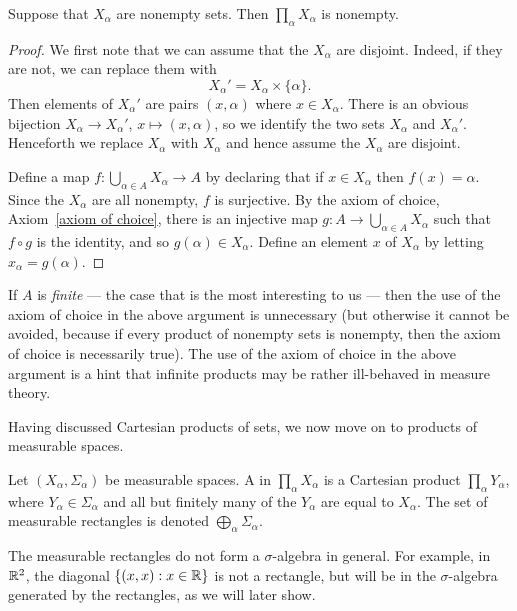 \begin{lemma}
Suppose that $X_{\alpha}$ are nonempty sets. Then $\prod_{\alpha} X_{\alpha}$ is nonempty.
\end{lemma}
\begin{proof}
We first note that we can assume that the $X_{\alpha}$ are disjoint. Indeed, if they are not, we can replace them with
\[X_{\alpha}' = X_{\alpha} \times \{\alpha\}.\]
Then elements of $X_{\alpha}'$ are pairs $(x, \alpha)$ where $x \in X_{\alpha}$.
There is an obvious bijection $X_{\alpha} \to X_{\alpha}'$, $x \mapsto (x, \alpha)$, so we identify the two sets $X_{\alpha}$ and $X_{\alpha}'$.
Henceforth we replace $X_{\alpha}$ with $X_{\alpha}$ and hence assume the $X_{\alpha}$ are disjoint.

Define a map $f: \bigcup_{\alpha \in A} X_{\alpha} \to A$ by declaring that if $x \in X_{\alpha}$ then $f(x) = \alpha$.
Since the $X_{\alpha}$ are all nonempty, $f$ is surjective.
By the axiom of choice, Axiom~\ref{axiom of choice}, there is an injective map $g: A \to \bigcup_{\alpha \in A} X_{\alpha}$ such that $f \circ g$ is the identity, and so $g(\alpha) \in X_{\alpha}$.
Define an element $x$ of $X_{\alpha}$ by letting $x_{\alpha} = g(\alpha)$.
\end{proof}
If $A$ is \emph{finite} --- the case that is the most interesting to us --- then the use of the axiom of choice in the above argument is unnecessary (but otherwise it cannot be avoided, because if every product of nonempty sets is nonempty, then the axiom of choice is necessarily true).
The use of the axiom of choice in the above argument is a hint that infinite products may be rather ill-behaved in measure theory.

Having discussed Cartesian products of sets, we now move on to products of measurable spaces.
\begin{definition}
Let $(X_{\alpha}, \Sigma_{\alpha})$ be measurable spaces.
A  in $\prod_{\alpha} X_{\alpha}$ is a Cartesian product $\prod_{\alpha} Y_{\alpha}$, where $Y_{\alpha} \in \Sigma_{\alpha}$ and all but finitely many of the $Y_{\alpha}$ are equal to $X_{\alpha}$.
The set of measurable rectangles is denoted $\bigoplus_{\alpha} \Sigma_{\alpha}$.
\end{definition}

The measurable rectangles do not form a $\sigma$-algebra in general.
For example, in $\mathbb{R}^{2}$, the diagonal $\{(x, x): x \in \mathbb{R}\}$ is not a rectangle, but will be in the $\sigma$-algebra generated by the rectangles, as we will later show.

